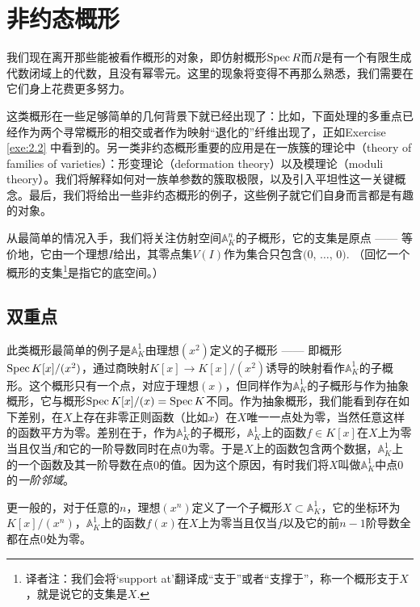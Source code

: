 \section{非约态概形}

我们现在离开那些能被看作概形的对象，即仿射概形$\operatorname{Spec} R$而$R$是有一个有限生成代数闭域上的代数，且没有幂零元。这里的现象将变得不再那么熟悉，我们需要在它们身上花费更多努力。

这类概形在一些足够简单的几何背景下就已经出现了：比如，下面处理的多重点已经作为两个寻常概形的相交或者作为映射“退化的”纤维出现了，正如Exercise \ref{exe:2.2} 中看到的。另一类非约态概形重要的应用是在一族簇的理论中（theory of families of varieties）：形变理论（deformation theory）以及模理论（moduli theory）。我们将解释如何对一族单参数的簇取极限，以及引入平坦性这一关键概念。最后，我们将给出一些非约态概形的例子，这些例子就它们自身而言都是有趣的对象。

从最简单的情况入手，我们将关注仿射空间$\mathbb{A}_K^n$的子概形，它的支集是原点 ------ 等价地，它由一个理想$I$给出，其零点集$V(I)$作为集合只包含$(0$, $\dots$, $0)$. （回忆一个概形的支集\footnote{译者注：我们会将`support at'翻译成“支于”或者“支撑于”，称一个概形支于$X$，就是说它的支集是$X$.}是指它的底空间。）

\subsection{双重点}\label{s:2.3.1}
\begin{exa}
	此类概形最简单的例子是$\mathbb{A}_K^1$由理想$(x^2)$定义的子概形 ------ 即概形$\operatorname{Spec} K[x]/(x^2)$，通过商映射$K[x]\to K[x]/(x^2)$诱导的映射看作$\mathbb{A}_K^1$的子概形。这个概形只有一个点，对应于理想$(x)$，但同样作为$\mathbb{A}_K^1$的子概形与作为抽象概形，它与概形$\operatorname{Spec} K[x]/(x)=\operatorname{Spec} K$不同。作为抽象概形，我们能看到存在如下差别，在$X$上存在非零正则函数（比如$x$）在$X$唯一一点处为零，当然任意这样的函数平方为零。差别在于，作为$\mathbb{A}_K^1$的子概形，$\mathbb{A}_K^1$上的函数$f\in K[x]$在$X$上为零当且仅当$f$和它的一阶导数同时在点$0$为零。于是$X$上的函数包含两个数据，$\mathbb{A}_K^1$上的一个函数及其一阶导数在点$0$的值。因为这个原因，有时我们将$X$叫做$\mathbb{A}_K^1$中点$0$的\textit{一阶邻域}。
\end{exa}

更一般的，对于任意的$n$，理想$(x^n)$定义了一个子概形$X\subset \mathbb{A}_K^1$，它的坐标环为$K[x]/(x^n)$，$\mathbb{A}_K^1$上的函数$f(x)$在$X$上为零当且仅当$f$以及它的前$n-1$阶导数全都在点$0$处为零。

